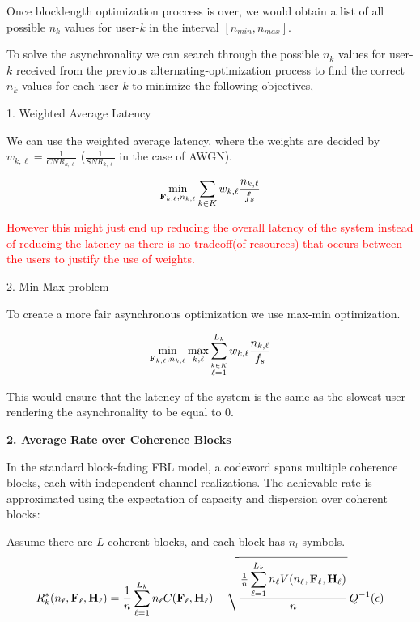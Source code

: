 \documentclass[a4paper, 12pt, onecolumn, journal, twoside, draftclsnofoot]{IEEEtran}
\begin{document}
Once blocklength optimization proccess is over, we would obtain a list of all possible $n_k$ values for user-$k$ in the interval $[n_{min}, n_{max}]$.

To solve the asynchronality we can search through the possible $n_k$ values  for user-$k$  received from the previous alternating-optimization process to find the correct $n_k$ values for each user $k$ to minimize the following objectives,


1. Weighted Average Latency 

We can use the weighted average latency, where the weights are decided by $w_{k,\ell} = \frac{1}{CNR_{k,\ell}}$ ($\frac{1}{SNR_{k,\ell}}$ in the case of AWGN).

\begin{equation*}
	\min_{{\bf F}_{k,\ell}, n_{k,\ell}} \sum_{k \in K} w_{k,\ell} \frac{n_{k,\ell}}{f_s}
\end{equation*}

\textcolor{red}{However this might just end up reducing the overall latency of the system instead of reducing the latency as there is no tradeoff(of resources) that occurs between the users to justify the use of weights.}


2. Min-Max problem


To create a more fair asynchronous optimization we use max-min optimization.

\begin{equation*}
	\min_{ {\bf F}_{k,\ell}, n_{k,\ell}} \max_{k,\ell} \sum_{\stackrel {k \in K} {\ell =1}}^{L_k} w_{k,\ell} \frac{n_{k,\ell}}{f_s}
\end{equation*}

This would ensure that the latency of the system is the same as the slowest user rendering the asynchronality to be equal to $0$.

\textbf{2. Average Rate over Coherence Blocks}

In the standard block-fading FBL model, a codeword spans multiple coherence blocks, each with independent channel realizations. The achievable rate is approximated using the expectation of capacity and dispersion over coherent blocks:

Assume there are $L$ coherent blocks, and each block has $n_l$ symbols.
\begin{equation*}
		R^*_k(n_\ell, {\bf F}_\ell, {\bf H}_\ell) = \frac{1}{n} \sum_{\ell=1}^{L_k} n_\ell C({\bf F}_\ell, {\bf H}_\ell) - 
	\sqrt{\frac{\frac{1}{n} \displaystyle \sum_{\ell=1}^{L_k} n_\ell V(n_\ell, {\bf F}_\ell, {\bf H}_\ell)}{n}} \, Q^{-1}(\epsilon)
\end{equation*}
\end{document}
